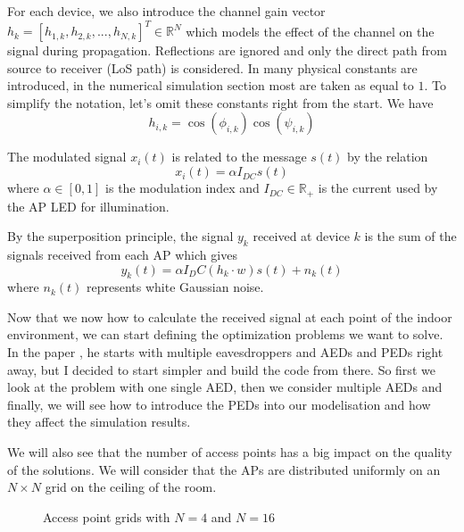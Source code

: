 \documentclass[a4paper,12pt,twoside]{article}
\begin{document}
	For each device, we also introduce the channel gain vector $h_k = [h_{1,k}, h_{2,k}, ... , h_{N,k}]^T \in \mathbb{R}^N$ which models the effect of the channel on the signal during propagation. Reflections are ignored and only the direct path from source to receiver (LoS path) is considered. In \cite{Oxford2021} many physical constants are introduced, in the numerical simulation section most are taken as equal to $1$. To simplify the notation, let's omit these constants right from the start. We have
	\begin{equation}
		h_{i,k} = \cos(\phi_{i,k})\cos(\psi_{i,k})
	\end{equation}
	
	The modulated signal $x_i(t)$ is related to the message $s(t)$ by the relation
	\begin{equation}
		x_i(t) = \alpha I_{DC} s(t)
	\end{equation}
	where $\alpha \in [0, 1]$ is the modulation index and $I_{DC} \in \mathbb{R}_+$ is the current used by the AP LED for illumination. 
	
	By the superposition principle, the signal $y_k$ received at device $k$ is the sum of the signals received from each AP which gives
	\begin{equation}
		y_k(t) = \alpha I_DC (h_k \cdot w) s(t) + n_k(t)
	\end{equation}
	where $n_k(t)$ represents white Gaussian noise.
	
	Now that we now how to calculate the received signal at each point of the indoor environment, we can start defining the optimization problems we want to solve. In the paper \cite{Oxford2021}, he starts with multiple eavesdroppers and AEDs and PEDs right away, but I decided to start simpler and build the code from there. So first we look at the problem with one single AED, then we consider multiple AEDs and finally, we will see how to introduce the PEDs into our modelisation and how they affect the simulation results.
	
	We will also see that the number of access points has a big impact on the quality of the solutions. We will consider that the APs are distributed uniformly on an $N \times N$ grid on the ceiling of the room.
	
	\begin{figure}[h!]
		\centering
		\hfill
		\caption{Access point grids with $N=4$ and $N=16$}
		\label{APs}
	\end{figure}
	
\end{document}
